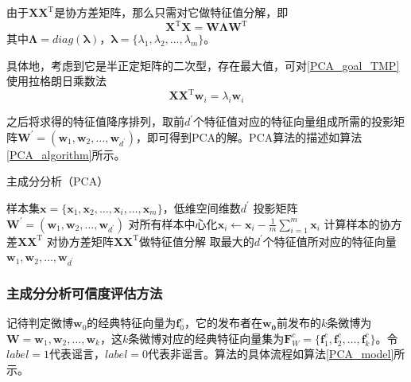 \documentclass[a4paper,AutoFakeBold,oneside,12pt]{book}
\begin{document}
由于$\bm{X}\bm{X}^ \mathrm{ T }$是协方差矩阵，那么只需对它做特征值分解，即
\begin{equation}
    \label{PCA_eigenvalue}
    \bm{X}^ \mathrm{ T }\bm{X} = \bm{W}\bm{\Lambda}\bm{W}^ \mathrm{ T }
\end{equation}
其中$\bm{\Lambda}=diag(\bm{\lambda})$，$\bm{\lambda} = \{\lambda_1,\lambda_2,\ldots,\lambda_m\}$。

具体地，考虑到它是半正定矩阵的二次型，存在最大值，可对\eqref{PCA_goal_TMP}使用拉格朗日乘数法
\begin{equation}
\bm{X}\bm{X}^ \mathrm{ T }\bm{w}_i  = \lambda_i \bm{w}_i
\end{equation}

之后将求得的特征值降序排列，取前$d^\prime$个特征值对应的特征向量组成所需的投影矩阵$\bm{W}^\prime =(\bm{w}_1,\bm{w}_2,\ldots,\bm{w}_{d^\prime})$，即可得到PCA的解。PCA算法的描述如算法\ref{PCA_algorithm}所示。

\begin{algorithm} 
	\begin{spacing}{1.3}
		\caption{主成分分析（PCA）} 
		\label{PCA_algorithm}
		\renewcommand{\algorithmicrequire}{\textbf{输入：}}
		\renewcommand{\algorithmicensure}{\textbf{输出：}} 
		\begin{algorithmic}[1] 
			\Require 样本集$\bm{x}=\{\bm{x}_1,\bm{x}_2,\ldots,\bm{x}_i,\ldots,\bm{x}_m\}$，低维空间维数$d^\prime$ 
			\Ensure 投影矩阵  $\bm{W}^\prime =(\bm{w}_1,\bm{w}_2,\ldots,\bm{w}_{d^\prime})$
			\State 对所有样本中心化$\bm{x}_i \gets \bm{x}_i - \frac{1}{m}\sum_{i=1}^m \bm{x}_i$
			\State  计算样本的协方差$\bm{X}\bm{X}^ \mathrm{T}$
			\State 对协方差矩阵$\bm{X}\bm{X}^ \mathrm{T}$做特征值分解
			\State 取最大的$d^\prime$个特征值所对应的特征向量$\bm{w}_1,\bm{w}_2,\ldots,\bm{w}_{d^\prime}$
		\end{algorithmic}  
	\end{spacing}
\end{algorithm}

\subsubsection{主成分分析可信度评估方法}
记待判定微博$\bm{w}_0$的经典特征向量为$\bm{f}^{c}_{0}$，它的发布者在$\bm{w_0}$前发布的$k$条微博为$\bm{W} = \bm{w}_1,\bm{w}_2,\ldots,\bm{w}_k$，这$k$条微博对应的经典特征向量集为$\bm{F}^{c}_{W} = \{ \bm{f}^{c}_{1},\bm{f}^{c}_{2},\ldots,\bm{f}^{c}_{k} \}$。令$label = 1$代表谣言，$label = 0$代表非谣言。算法的具体流程如算法\ref{PCA_model}所示。
\end{document}
